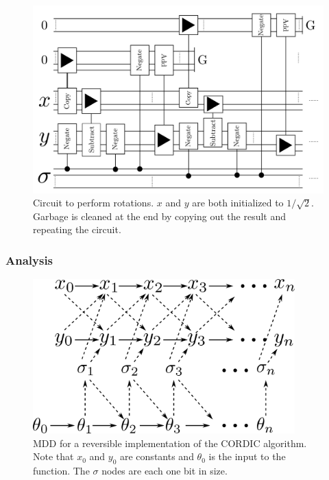             \begin{figure}
                \capstart
                \centering
                \includegraphics[width=\textwidth]{images/CORDICRotations}
                \caption{Circuit to perform rotations.
                         $x$ and $y$ are both initialized to $1/\sqrt{2}$.
                         Garbage is cleaned at the end by copying out the result and repeating the circuit.}
                \label{fig:CORDICRotations}
            \end{figure}
        \subsubsection{Analysis}
	\begin{figure}
                \capstart
                \centering
                \includegraphics[width=0.9\textwidth]{images/CordicMDD}

                \caption{MDD for a reversible implementation of the CORDIC
                algorithm. Note that $x_0$ and $y_0$ are constants and
                $\theta_0$ is the input to the function.
                The $\sigma$ nodes are each one bit in size.}

                \label{fig:CordicMDD}
        \end{figure}

